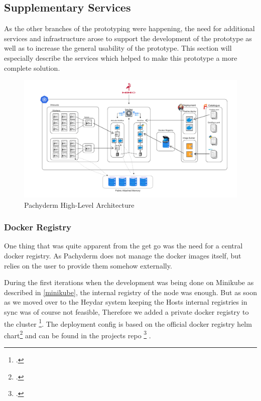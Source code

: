 \subsection{Supplementary Services}

As the other branches of the prototyping were happening, the need for additional services and infrastructure arose to 
support the development of the prototype as well as to increase the general usability of the prototype. 
This section will especially describe the services which helped to make this prototype a more complete solution.


\begin{figure}[htb]
    \centering
    \includegraphics[width=17cm]{graphics/pachykouda_complete.png}
    \caption[Pachyderm High-Level Architecture]{Pachyderm High-Level Architecture}
    \label{abb:pachyderm_complete}
\end{figure}

\subsubsection{Docker Registry}

One thing that was quite apparent from the get go was the need for a central docker registry.
As Pachyderm does not manage the docker images itself, but relies on the user to provide them somehow externally.

During the first iterations when the development was being done on Minikube as described in \ref{minikube}, the internal registry 
of the node was enough.
But as soon as we moved over to the Heydar system keeping the Hosts internal registries in sync was of course not feasible,
Therefore we added a private docker registry to the cluster \footcite{kumarHowSetupPrivate2020}.
The deployment config is based on the official docker registry helm chart\footcite{Dockerregistry10Phntom} and can be found in the projects repo \footcite{dokcer_registry} .

